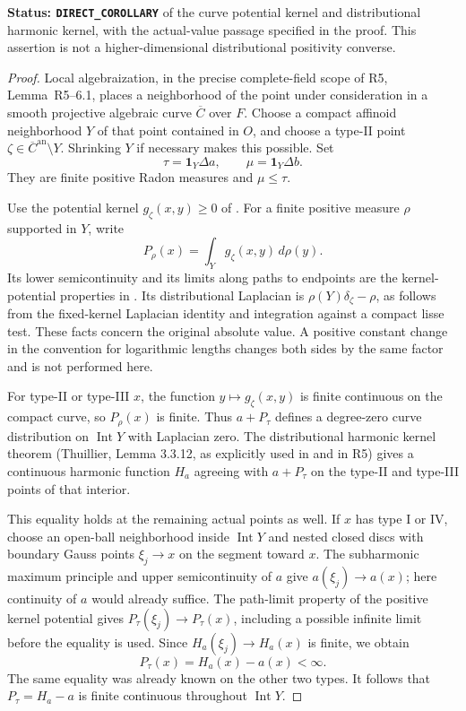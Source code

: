 \documentclass[11pt,a4paper]{article}
\numberwithin{equation}{section}
\theoremstyle{definition}
\theoremstyle{remark}
\newcommand{\an}{\mathrm{an}}
\begin{document}
\noindent\textbf{Status: \texttt{DIRECT\_COROLLARY}} of the
curve potential kernel and distributional harmonic kernel, with the
actual-value passage specified in the proof. This assertion is not
a higher-dimensional distributional positivity converse.

\begin{proof}
Local algebraization, in the precise complete-field scope of R5,
Lemma~\textup{R5--6.1}, places a neighborhood
of the point under consideration in a smooth projective algebraic
curve $\overline C$ over $F$. Choose a compact affinoid neighborhood
$Y$ of that point contained in $O$, and choose a type-II point
$\zeta\in\overline C^{\an}\setminus Y$. Shrinking $Y$ if necessary
makes this possible. Set
\[
             \tau=\mathbf1_Y\Delta a,\qquad
             \mu=\mathbf1_Y\Delta b.
\]
They are finite positive Radon measures and $\mu\le\tau$.

Use the potential kernel $g_\zeta(x,y)\ge0$ of
\cite[Definition 4.4, Lemma 4.7 and Proposition 4.8]{Wan22}.
For a finite positive measure $\rho$ supported in $Y$, write
\[
                   P_\rho(x)=\int_Y g_\zeta(x,y)\,d\rho(y).
\]
Its lower semicontinuity and its limits along paths to endpoints
are the kernel-potential properties in
\cite[Proposition 6.5]{Wan22}. Its distributional Laplacian is
$\rho(Y)\delta_\zeta-\rho$, as follows from the fixed-kernel
Laplacian identity and integration against a compact lisse test.
These facts concern the original absolute value. A positive constant
change in the convention for logarithmic lengths changes both sides
by the same factor and is not performed here.

For type-II or type-III $x$, the function $y\mapsto g_\zeta(x,y)$
is finite continuous on the compact curve, so $P_\rho(x)$ is finite.
Thus $a+P_\tau$ defines a degree-zero curve distribution on
$\operatorname{Int}Y$ with Laplacian zero. The distributional harmonic
kernel theorem (Thuillier, Lemma 3.3.12, as explicitly used in
\cite[Remarks 7.2 and 7.12]{Wan22} and in R5) gives a continuous
harmonic function $H_a$ agreeing with $a+P_\tau$ on the type-II
and type-III points of that interior.

This equality holds at the remaining actual points as well. If
$x$ has type I or IV, choose an open-ball neighborhood inside
$\operatorname{Int}Y$ and nested closed discs with boundary Gauss
points $\xi_j\to x$ on the segment toward $x$. The subharmonic
maximum principle and upper semicontinuity of $a$ give
$a(\xi_j)\to a(x)$; here continuity of $a$ would already suffice.
The path-limit property of the positive kernel potential gives
$P_\tau(\xi_j)\to P_\tau(x)$, including a possible infinite
limit before the equality is used. Since
$H_a(\xi_j)\to H_a(x)$ is finite, we obtain
\[
                  P_\tau(x)=H_a(x)-a(x)<\infty.
\]
The same equality was already known on the other two types.
It follows that $P_\tau=H_a-a$ is finite continuous throughout
$\operatorname{Int}Y$.


\end{proof}
\end{document}
